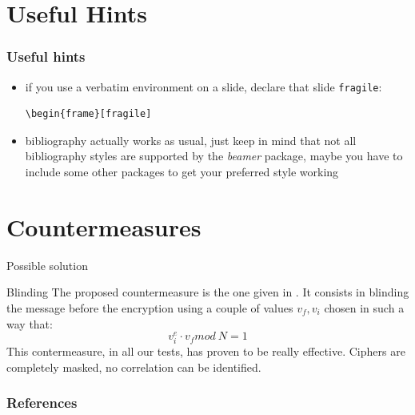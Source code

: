 \documentclass{beamer}
\begin{document}
\section{Useful Hints}

\begin{frame}[fragile]
\frametitle{Useful hints}
\begin{itemize}
\item if you use a verbatim environment on a slide, declare that slide {\tt fragile}:
\begin{verbatim}
\begin{frame}[fragile]
\end{verbatim}
\item bibliography actually works as usual, just keep in mind that not all bibliography styles are supported by the {\it beamer}
      package, maybe you have to include some other packages to get your preferred style working
\end{itemize}
\end{frame}

\nocite{*}


\section{Countermeasures}
\begin{frame}{Possible solution}
    \begin{block}{Blinding}
		The proposed countermeasure is the one given in \cite{kocher1996timing}.
		It consists in blinding the message before the encryption using a couple of values $v_f, v_i$ chosen in such a way that:
		\begin{equation*}
			v_i^e \cdot v_f mod\: N = 1
		\end{equation*}
        This contermeasure, in all our tests, has proven to be really effective. Ciphers are completely masked, no correlation can be identified.
    \end{block}
\end{frame}

\begin{frame}[allowframebreaks]
	\frametitle{References}
	\footnotesize
	
	
\end{frame}
\end{document}
